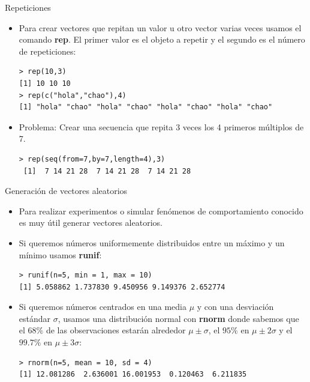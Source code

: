 \documentclass[handout]{beamer}
\begin{document}
\begin{frame}[fragile]{Repeticiones}
\scriptsize{
\begin{itemize}
 \item Para crear vectores que repitan un valor u otro vector varias veces usamos el comando \textbf{rep}. El primer valor es el objeto a repetir y el segundo es el número de repeticiones:
 \begin{verbatim}
> rep(10,3)
[1] 10 10 10
> rep(c("hola","chao"),4)
[1] "hola" "chao" "hola" "chao" "hola" "chao" "hola" "chao"
 \end{verbatim}
 \item Problema: Crear una secuencia que repita 3 veces los 4 primeros múltiplos de 7. \pause
 \begin{verbatim}
> rep(seq(from=7,by=7,length=4),3)
 [1]  7 14 21 28  7 14 21 28  7 14 21 28
\end{verbatim}
 
 
\end{itemize}
 
 
 
} 
\end{frame}

\begin{frame}[fragile]{Generación de vectores aleatorios}
\scriptsize{
\begin{itemize}
 \item Para realizar experimentos o simular fenómenos de comportamiento conocido es muy útil generar vectores aleatorios. 
 \item Si queremos números uniformemente distribuidos entre un máximo y un mínimo usamos \textbf{runif}:
 \begin{verbatim}
> runif(n=5, min = 1, max = 10)
[1] 5.058862 1.737830 9.450956 9.149376 2.652774
 \end{verbatim}
 \item Si queremos números centrados en una media $\mu$ y con una desviación estándar $\sigma$, usamos una distribución normal con \textbf{rnorm} donde sabemos que el $68\%$ de las observaciones estarán alrededor $\mu\pm\sigma$, el $95\%$ en $\mu\pm2\sigma$ y el $99.7\%$ en $\mu\pm3\sigma$:
 
 \begin{verbatim}
> rnorm(n=5, mean = 10, sd = 4)
[1] 12.081286  2.636001 16.001953  0.120463  6.211835
 \end{verbatim}
 
\end{itemize}

}
\end{frame}
\end{document}
